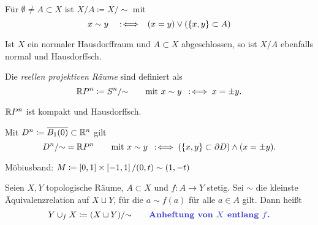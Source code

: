 \documentclass{cheat-sheet}
\begin{document}
\begin{nota}
  Für $\emptyset \not= A \subset X$ ist $X/A \coloneqq X/{\sim}$ mit
  \[ x \sim y \enspace \enspace:\!\iff \enspace (x = y) \vee (\{ x, y \} \subset A) \]
\end{nota}

\begin{prop}
  Ist $X$ ein normaler Hausdorffraum und $A \subset X$ abgeschlossen, so ist $X/A$ ebenfalls normal und Hausdorffsch.
\end{prop}


\begin{defn}
  Die \emph{reellen projektiven Räume} sind definiert als
  \[ \mathbb{R} P^n \coloneqq S^n/{\sim} \qquad \text{mit } x \sim y \enspace:\!\iff x = \pm y. \]
\end{defn}

\begin{prop}
  $\mathbb{R} P^n$ ist kompakt und Hausdorffsch.
\end{prop}

\begin{bem}
  Mit $D^n \coloneqq \overline{B_1(0)} \subset \mathbb{R}^n$ gilt
  \[ D^n / {\sim} = \mathbb{R} P^n \qquad \text{mit } x \sim y \enspace:\!\iff (\{ x, y \} \subset \partial D) \wedge (x = \pm y). \]
\end{bem}


\begin{bsp}
  Möbiusband: $M \coloneqq \left[ 0, 1 \right] \times \left[ -1, 1 \right] / (0, t) \sim (1, -t)$
\end{bsp}


\begin{defn}
  Seien $X, Y$ topologische Räume, $A \subset X$ und $f : A \to Y$ stetig. Sei ${\sim}$ die kleinste Äquivalenzrelation auf $X \sqcup Y$, für die $a \sim f(a)$ für alle $a \in A$ gilt. Dann heißt
  \[
    Y \cup_f X \coloneqq (X \sqcup Y) / {\sim}
    \qquad \text{\emph{Anheftung von $X$ entlang $f$.}}
  \]
\end{defn}
\end{document}
